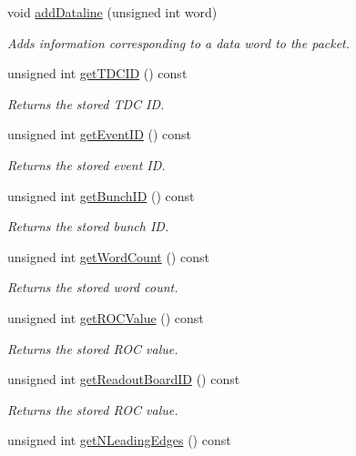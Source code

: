 \begin{DoxyCompactItemize}
void \hyperlink{class_packet_a5a3c458b3587775aba89a8e09c214155}{add\+Dataline} (unsigned int word)
\begin{DoxyCompactList}\small\item\em Adds information corresponding to a data word to the packet. \end{DoxyCompactList}\item 
unsigned int \hyperlink{class_packet_a4f4c3d99d89506a577073a2ce9e75e95}{get\+T\+D\+C\+ID} () const
\begin{DoxyCompactList}\small\item\em Returns the stored T\+DC ID. \end{DoxyCompactList}\item 
unsigned int \hyperlink{class_packet_a9a4d664eb908d788fc71bee88b905747}{get\+Event\+ID} () const
\begin{DoxyCompactList}\small\item\em Returns the stored event ID. \end{DoxyCompactList}\item 
unsigned int \hyperlink{class_packet_a3965d1b3a0e88e2af7cd1bd5ca97e009}{get\+Bunch\+ID} () const
\begin{DoxyCompactList}\small\item\em Returns the stored bunch ID. \end{DoxyCompactList}\item 
unsigned int \hyperlink{class_packet_aaa356da77eccb505207544c8034c1356}{get\+Word\+Count} () const
\begin{DoxyCompactList}\small\item\em Returns the stored word count. \end{DoxyCompactList}\item 
unsigned int \hyperlink{class_packet_a2a46912b82833c80b53e01114ef701a1}{get\+R\+O\+C\+Value} () const
\begin{DoxyCompactList}\small\item\em Returns the stored R\+OC value. \end{DoxyCompactList}\item 
unsigned int \hyperlink{class_packet_a85eb57c2213797b64d6102bff9311e1b}{get\+Readout\+Board\+ID} () const
\begin{DoxyCompactList}\small\item\em Returns the stored R\+OC value. \end{DoxyCompactList}\item 
unsigned int \hyperlink{class_packet_a461a138986888a01fb04205512a37410}{get\+N\+Leading\+Edges} () const

\end{DoxyCompactItemize}
